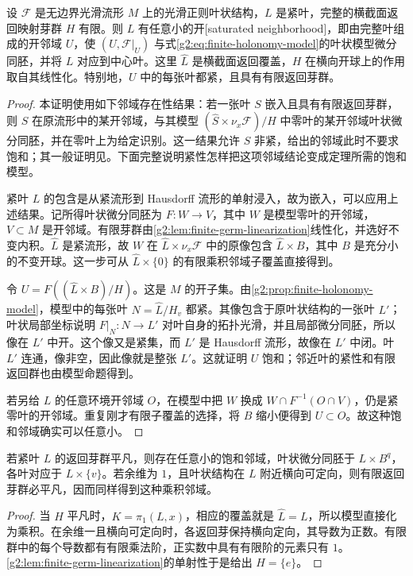\begin{theorem}\label{g2:thm:reeb-local-stability}
	设 \(\mathcal F\) 是无边界光滑流形 \(M\) 上的光滑正则叶状结构，\(L\) 是紧叶，完整的横截面返回映射芽群 \(H\) 有限。则 \(L\) 有任意小的开[saturated neighborhood]，即由完整叶组成的开邻域 \(U\)，使 \((U,\mathcal F|_U)\) 与式\eqref{g2:eq:finite-holonomy-model}的叶状模型微分同胚，并将 \(L\) 对应到中心叶。这里 \(\widehat L\) 是横截面返回覆盖，\(H\) 在横向开球上的作用取自其线性化。特别地，\(U\) 中的每张叶都紧，且具有有限返回芽群。
\end{theorem}
\begin{proof}
	本证明使用如下邻域存在性结果：若一张叶 \(S\) 嵌入且具有有限返回芽群，则 \(S\) 在原流形中的某开邻域，与其模型 \((\widehat S\times\nu_x\mathcal F)/H\) 中零叶的某开邻域叶状微分同胚，并在零叶上为给定识别。这一结果允许 \(S\) 非紧，给出的邻域此时不要求饱和；其一般证明见\cite[第2节，引理1，222--226页]{CrainicMarcut2015ReebStability}。下面完整说明紧性怎样把这项邻域结论变成定理所需的饱和模型。

	紧叶 \(L\) 的包含是从紧流形到 Hausdorff 流形的单射浸入，故为嵌入，可以应用上述结果。记所得叶状微分同胚为 \(F:W\to V\)，其中 \(W\) 是模型零叶的开邻域，\(V\subset M\) 是开邻域。有限芽群由\cref{g2:lem:finite-germ-linearization}线性化，并选好不变内积。\(\widehat L\) 是紧流形，故 \(W\) 在 \(\widehat L\times\nu_x\mathcal F\) 中的原像包含 \(\widehat L\times B\)，其中 \(B\) 是充分小的不变开球。这一步可从 \(\widehat L\times\{0\}\) 的有限乘积邻域子覆盖直接得到。

	令 \(U=F((\widehat L\times B)/H)\)。这是 \(M\) 的开子集。由\cref{g2:prop:finite-holonomy-model}，模型中的每张叶 \(N=\widehat L/H_v\) 都紧。其像包含于原叶状结构的一张叶 \(L'\)；叶状局部坐标说明 \(F|_N:N\to L'\) 对叶自身的拓扑光滑，并且局部微分同胚，所以像在 \(L'\) 中开。这个像又是紧集，而 \(L'\) 是 Hausdorff 流形，故像在 \(L'\) 中闭。叶 \(L'\) 连通，像非空，因此像就是整张 \(L'\)。这就证明 \(U\) 饱和；邻近叶的紧性和有限返回群也由模型命题得到。

	若另给 \(L\) 的任意环境开邻域 \(O\)，在模型中把 \(W\) 换成 \(W\cap F^{-1}(O\cap V)\)，仍是紧零叶的开邻域。重复刚才有限子覆盖的选择，将 \(B\) 缩小便得到 \(U\subset O\)。故这种饱和邻域确实可以任意小。
\end{proof}

\begin{corollary}\label{g2:cor:trivial-holonomy-product}
	若紧叶 \(L\) 的返回芽群平凡，则存在任意小的饱和邻域，叶状微分同胚于 \(L\times B^q\)，各叶对应于 \(L\times\{v\}\)。若余维为 \(1\)，且叶状结构在 \(L\) 附近横向可定向，则有限返回芽群必平凡，因而同样得到这种乘积邻域。
\end{corollary}
\begin{proof}
	当 \(H\) 平凡时，\(K=\pi_1(L,x)\)，相应的覆盖就是 \(\widehat L=L\)，所以模型直接化为乘积。在余维一且横向可定向时，各返回芽保持横向定向，其导数为正数。有限群中的每个导数都有有限乘法阶，正实数中具有有限阶的元素只有 \(1\)。\cref{g2:lem:finite-germ-linearization}的单射性于是给出 \(H=\{e\}\)。
\end{proof}

